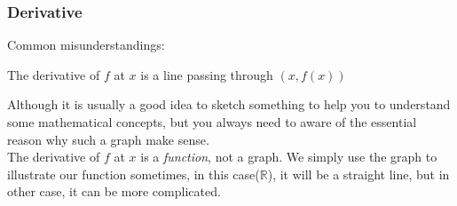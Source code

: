 \documentclass{beamer}
\begin{document}
\begin{frame}
    \frametitle{Derivative}
Common misunderstandings:\\
\vspace{0.5em}
    \begin{center}
        The derivative of $f$ at $x$ is a line passing through $(x,f(x))$
    \end{center}
\vspace{0.5em}

\hspace{1em} Although it is usually a good idea to sketch something to help you to understand some mathematical concepts, but you always need to 
aware of the essential reason why such a graph make sense.\\
\vspace{1em}
\hspace{1em} The derivative of $f$ at $x$ is a \emph{function}, not a graph. We simply use the graph to illustrate our function sometimes, in 
this case($\mathbb{R}$), it will be a straight line, but in other case, it can be more complicated.

\hspace{1em} 
\end{frame}
\end{document}

